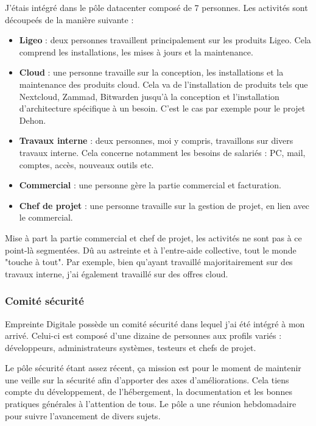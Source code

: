 \documentclass[12pt]{article}
\begin{document}
J'étais intégré dans le pôle datacenter composé de 7 personnes. 
Les activités sont découpeés de la manière suivante :
\begin{itemize}
    \item \textbf{Ligeo} : deux personnes travaillent principalement sur les produits Ligeo. 
    Cela comprend les installations, les mises à jours et la maintenance.
    \item \textbf{Cloud} : une personne travaille sur la conception, les installations et la maintenance des produits cloud. 
    Cela va de l'installation de produits tels que Nextcloud, Zammad, Bitwarden jusqu'à la conception et l'installation d'architecture spécifique à un besoin. 
    C'est le cas par exemple pour le projet Dehon.
    \item \textbf{Travaux interne} : deux personnes, moi y compris, travaillons sur divers travaux interne. 
    Cela concerne notamment les besoins de salariés : PC, mail, comptes, accès, nouveaux outils etc.
    \item \textbf{Commercial} : une personne gère la partie commercial et facturation.
    \item \textbf{Chef de projet} : une personne travaille sur la gestion de projet, en lien avec le commercial.
\end{itemize}

Mise à part la partie commercial et chef de projet, les activités ne sont pas à ce point-là segmentées. 
Dû au astreinte et à l'entre-aide collective, tout le monde "touche à tout". 
Par exemple, bien qu'ayant travaillé majoritairement sur des travaux interne, j'ai également travaillé sur des offres cloud.

\subsubsection{Comité sécurité}
Empreinte Digitale possède un comité sécurité dans lequel j'ai été intégré à mon arrivé.
Celui-ci est composé d'une dizaine de personnes aux profils variés : développeurs, administrateurs systèmes, testeurs et chefs de projet.

Le pôle sécurité étant assez récent, ça mission est pour le moment de maintenir une veille sur la sécurité afin d'apporter des axes d'améliorations. 
Cela tiens compte du développement, de l'hébergement, la documentation et les bonnes pratiques générales à l'attention de tous. 
Le pôle a une réunion hebdomadaire pour suivre l'avancement de divers sujets.

\newpage
\end{document}
